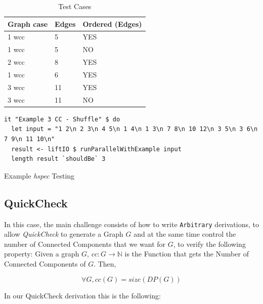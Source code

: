 \documentclass[preprint]{elsarticle}
\begin{document}
\begin{table}[H]
  \centering
  \begin{tabular}{|l|l|l|}
   \hline
   Graph case & Edges & Ordered (Edges)\\
   \hline
   1 \acrshort{wcc} & 5 & YES \\
   \hline
   1 \acrshort{wcc} & 5 & NO \\
   \hline
   2 \acrshort{wcc} & 8 & YES \\
   \hline
   1 \acrshort{wcc} & 6 & YES \\
   \hline
   3 \acrshort{wcc} & 11 & YES \\
   \hline
   3 \acrshort{wcc} & 11 & NO \\
   \hline
  \end{tabular}
 \caption{Test Cases}
 \label{table:apx:1}
 \end{table}

\begin{listing}[H]
\begin{verbatim}      
it "Example 3 CC - Shuffle" $ do
  let input = "1 2\n 2 3\n 4 5\n 1 4\n 1 3\n 7 8\n 10 12\n 3 5\n 3 6\n 7 9\n 11 10\n"
  result <- liftIO $ runParallelWithExample input
  length result `shouldBe` 3
\end{verbatim}
\caption{Example \textit{hspec} Testing}
\label{src:haskell:6}
\end{listing}

\subsection{QuickCheck}
In this case, the main challenge consists of how to write \texttt{Arbitrary} derivations, to 
allow \textit{QuickCheck} to generate a Graph $G$ and at the same time control the number of Connected Components that we want for $G$, to verify the following property: Given a graph $G$, $cc : G \to \mathbb{N}$ is the Function that gets the Number of Connected Components of $G$.
Then,

\begin{equation}
  \forall G, cc(G) = size(DP(G))
\end{equation}

In our QuickCheck derivation this is the following:
\end{document}
